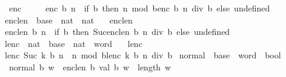 \begin{isabellebody}
\ \ {\isachardoublequoteopen}enc\ {\isacharunderscore}{\kern0pt}\ {}\ {\isacharequal}{\kern0pt}\ {\isacharbrackleft}{\kern0pt}{\isacharbrackright}{\kern0pt}{\isachardoublequoteclose}\isanewline
{\isacharbar}{\kern0pt}\ {\isachardoublequoteopen}enc\ b\ n\ {\isacharequal}{\kern0pt}\ {\isacharparenleft}{\kern0pt}if\ {}{\isasymle}b\ then\ n\ mod\ b{\isacharhash}{\kern0pt}enc\ b\ {\isacharparenleft}{\kern0pt}n\ div\ b{\isacharparenright}{\kern0pt}\ else\ undefined{\isacharparenright}{\kern0pt}{\isachardoublequoteclose}\isanewline
\isanewline
{}\isamarkupfalse%
\ enc{\isacharunderscore}{\kern0pt}len\ {\isacharcolon}{\kern0pt}{\isacharcolon}{\kern0pt}\ {\isachardoublequoteopen}base\ {\isasymRightarrow}\ nat\ {\isasymRightarrow}\ nat{\isachardoublequoteclose}\ \isanewline
\ \ {\isachardoublequoteopen}enc{\isacharunderscore}{\kern0pt}len\ {\isacharunderscore}{\kern0pt}\ {}\ {\isacharequal}{\kern0pt}\ {}{\isachardoublequoteclose}\isanewline
{\isacharbar}{\kern0pt}\ {\isachardoublequoteopen}enc{\isacharunderscore}{\kern0pt}len\ b\ n\ {\isacharequal}{\kern0pt}\ {\isacharparenleft}{\kern0pt}if\ {}{\isasymle}b\ then\ Suc{\isacharparenleft}{\kern0pt}enc{\isacharunderscore}{\kern0pt}len\ b\ {\isacharparenleft}{\kern0pt}n\ div\ b{\isacharparenright}{\kern0pt}{\isacharparenright}{\kern0pt}\ else\ undefined{\isacharparenright}{\kern0pt}{\isachardoublequoteclose}\isanewline
\isanewline
{}\isamarkupfalse%
\ lenc\ {\isacharcolon}{\kern0pt}{\isacharcolon}{\kern0pt}\ {\isachardoublequoteopen}nat\ {\isasymRightarrow}\ base\ {\isasymRightarrow}\ nat\ {\isasymRightarrow}\ word{\isachardoublequoteclose}\ \isanewline
\ \ {\isachardoublequoteopen}lenc\ {}\ {\isacharunderscore}{\kern0pt}\ {\isacharunderscore}{\kern0pt}\ {\isacharequal}{\kern0pt}\ {\isacharbrackleft}{\kern0pt}{\isacharbrackright}{\kern0pt}{\isachardoublequoteclose}\isanewline
{\isacharbar}{\kern0pt}\ {\isachardoublequoteopen}lenc\ {\isacharparenleft}{\kern0pt}Suc\ k{\isacharparenright}{\kern0pt}\ b\ n\ {\isacharequal}{\kern0pt}\ n\ mod\ b{\isacharhash}{\kern0pt}lenc\ k\ b\ {\isacharparenleft}{\kern0pt}n\ div\ b{\isacharparenright}{\kern0pt}{\isachardoublequoteclose}\isanewline
\isanewline
{}\isamarkupfalse%
\ normal\ {\isacharcolon}{\kern0pt}{\isacharcolon}{\kern0pt}\ {\isachardoublequoteopen}base\ {\isasymRightarrow}\ word\ {\isasymRightarrow}\ bool{\isachardoublequoteclose}\ \isanewline
\ \ {\isachardoublequoteopen}normal\ b\ w\ {\isasymequiv}\ enc{\isacharunderscore}{\kern0pt}len\ b\ {\isacharparenleft}{\kern0pt}val\ b\ w{\isacharparenright}{\kern0pt}\ {\isacharequal}{\kern0pt}\ length\ w{\isachardoublequoteclose}%

\end{isabellebody}
